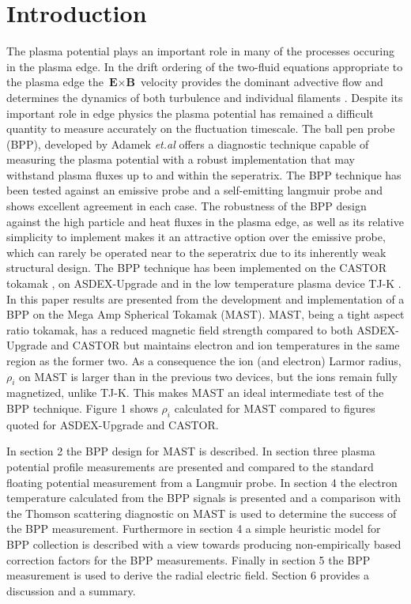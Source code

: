 \documentclass[11pt]{iopart}
\begin{document}
\section{Introduction}
The plasma potential plays an important role in many of the processes occuring in the plasma edge. In the drift ordering of the two-fluid equations appropriate to the plasma edge \cite{SimakovPoP2003,SimakovPoP2004} the $\textbf{E}\times\textbf{B}$ velocity provides the dominant advective flow and determines the dynamics of both turbulence \cite{MilitelloPPCF2013} and individual filaments \cite{WalkdenPPCF2013}. Despite its important role in edge physics the plasma potential has remained a difficult quantity to measure accurately on the fluctuation timescale. The ball pen probe (BPP), developed by Adamek \emph{et.al} \cite{AdamekCJP2004,AdamekCJP2005} offers a diagnostic technique capable of measuring the plasma potential with a robust implementation that may withstand plasma fluxes up to and within the seperatrix. The BPP technique has been tested against an emissive probe \cite{AdamekCJP2005} and a self-emitting langmuir probe \cite{AdamekPreprint} and shows excellent agreement in each case. The robustness of the BPP design against the high particle and heat fluxes in the plasma edge, as well as its relative simplicity to implement makes it an attractive option over the emissive probe, which can rarely be operated near to the seperatrix due to its inherently weak structural design. The BPP technique has been implemented on the CASTOR tokamak \cite{AdamekCJP2004,AdamekCJP2005,SchritweisserCJP2006}, on ASDEX-Upgrade \cite{AdamekJNM2009,AdamekCPP2010,HoracekNF2010} and in the low temperature plasma device TJ-K \cite{AdamekCPP2013}. 
\\In this paper results are presented from the development and implementation of a BPP on the Mega Amp Spherical Tokamak (MAST). MAST, being a tight aspect ratio tokamak, has a reduced magnetic field strength compared to both ASDEX-Upgrade and CASTOR but maintains electron and ion temperatures in the same region as the former two. As a consequence the ion (and electron) Larmor radius, $\rho_{i}$ on MAST is larger than in the previous two devices, but the ions remain fully magnetized, unlike TJ-K. This makes MAST an ideal intermediate test of the BPP technique. Figure 1 shows $\rho_{i}$ calculated for MAST compared to figures quoted for ASDEX-Upgrade and CASTOR.
\begin{figure}
\caption{}
\end{figure}
In section 2 the BPP design for MAST is described. In section three plasma potential profile measurements are presented and compared to the standard floating potential measurement from a Langmuir probe. In section 4 the electron temperature calculated from the BPP signals is presented and a comparison with the Thomson scattering diagnostic on MAST is used to determine the success of the BPP measurement. Furthermore in section 4 a simple heuristic model for BPP collection is described with a view towards producing non-empirically based correction factors for the BPP measurements. Finally in section 5 the BPP measurement is used to derive the radial electric field. Section 6 provides a discussion and a summary. 
\end{document}
